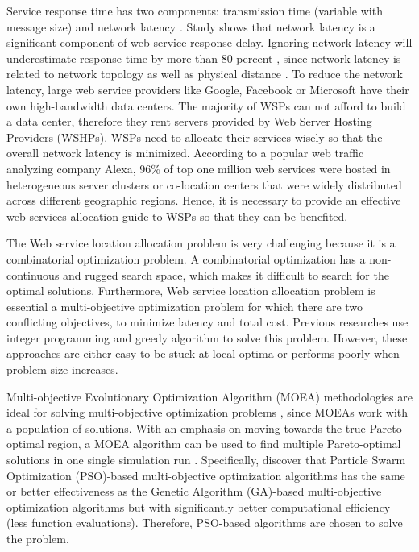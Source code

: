Service response time has two components: transmission time (variable with message size) and network latency \cite{Johansson}. 
Study \cite{916684} shows that network latency is a significant component of web service response delay.
Ignoring network latency will underestimate response time by more than 80 percent \cite{Sun}, since network latency is related to network topology as well as physical distance \cite{distanceMetrics}. 
To reduce the network latency, large web service providers like Google, Facebook or Microsoft have their own high-bandwidth data centers. The majority of WSPs
can not afford to build a data center, therefore they rent servers provided by Web Server Hosting Providers (WSHPs). WSPs need to allocate their services wisely so that the overall network latency is minimized. 
According to a popular web traffic analyzing company Alexa, 96\% of top one million web services were hosted
in heterogeneous server clusters or co-location centers \cite{He} that were widely distributed across different geographic regions. 
Hence, it is necessary to provide an effective web services allocation guide to WSPs so that they can be benefited.


The Web service location allocation problem is very challenging because it is a combinatorial optimization problem. A combinatorial optimization has 
a non-continuous and rugged search space, which makes it difficult to search for the optimal solutions. Furthermore, Web service location allocation problem is
essential a multi-objective optimization problem \cite{Multiobjective} for which there are two conflicting objectives, to minimize latency and total cost.
Previous researches \cite{Aboolian, Sun} use integer programming and greedy algorithm to solve this problem. However, these approaches are either easy to be stuck at 
local optima or performs poorly when problem size increases.

Multi-objective Evolutionary Optimization Algorithm (MOEA) methodologies are ideal for solving multi-objective optimization problems \cite{key:article}, 
since MOEAs work with a population of solutions.
With an emphasis on moving towards the true Pareto-optimal region, a MOEA algorithm can be used to find multiple Pareto-optimal solutions in 
one single simulation run \cite{OptimizationElectrical}. 
Specifically, \cite{godinez2010,hassan2005} discover that Particle Swarm Optimization (PSO)-based multi-objective optimization algorithms has the same or better effectiveness as 
the Genetic Algorithm (GA)-based multi-objective optimization algorithms but with significantly better computational efficiency (less function evaluations). 
Therefore, PSO-based algorithms are chosen to solve the problem.


